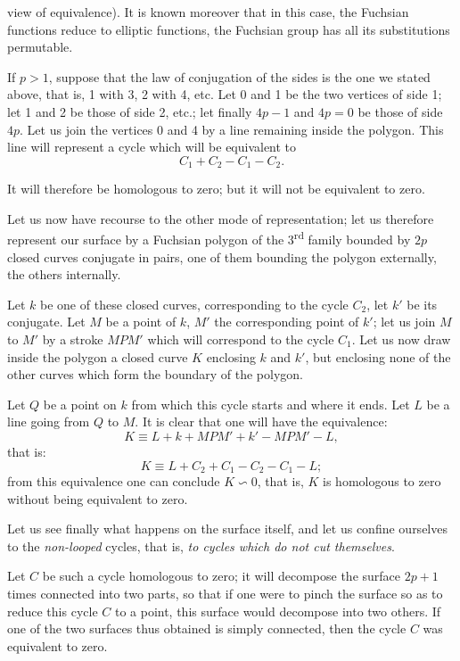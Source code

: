 \documentclass{article}
\begin{document}
view of equivalence). It is known moreover that in this case, the Fuchsian functions reduce to elliptic functions, the Fuchsian group has all its substitutions permutable.

If $p > 1$, suppose that the law of conjugation of the sides is the one we stated above, that is, 1 with 3, 2 with 4, etc. Let 0 and 1 be the two vertices of side 1; let 1 and 2 be those of side 2, etc.; let finally $4p - 1$ and $4p = 0$ be those of side $4p$. Let us join the vertices 0 and 4 by a line remaining inside the polygon. This line will represent a cycle which will be equivalent to
\[ C_{1} + C_{2} - C_{1} - C_{2}. \]

It will therefore be homologous to zero; but it will not be equivalent to zero.

Let us now have recourse to the other mode of representation; let us therefore represent our surface by a Fuchsian polygon of the 3\textsuperscript{rd} family bounded by $2p$ closed curves conjugate in pairs, one of them bounding the polygon externally, the others internally.

Let $k$ be one of these closed curves, corresponding to the cycle $C_{2}$, let $k'$ be its conjugate. Let $M$ be a point of $k$, $M'$ the corresponding point of $k'$; let us join $M$ to $M'$ by a stroke $MPM'$ which will correspond to the cycle $C_{1}$. Let us now draw inside the polygon a closed curve $K$ enclosing $k$ and $k'$, but enclosing none of the other curves which form the boundary of the polygon.

Let $Q$ be a point on $k$ from which this cycle starts and where it ends. Let $L$ be a line going from $Q$ to $M$. It is clear that one will have the equivalence:
\[ K \equiv L + k + MPM' + k' - MPM' - L, \]
that is:
\[ K \equiv L + C_{2} + C_{1} - C_{2} - C_{1} - L; \]
from this equivalence one can conclude $K \backsim 0$, that is, $K$ is homologous to zero without being equivalent to zero.

Let us see finally what happens on the surface itself, and let us confine ourselves to the \emph{non-looped} cycles, that is, \emph{to cycles which do not cut themselves}.

Let $C$ be such a cycle homologous to zero; it will decompose the surface $2p + 1$ times connected into two parts, so that if one were to pinch the surface so as to reduce this cycle $C$ to a point, this surface would decompose into two others. If one of the two surfaces thus obtained is simply connected, then the cycle $C$ was equivalent to zero.
\end{document}
